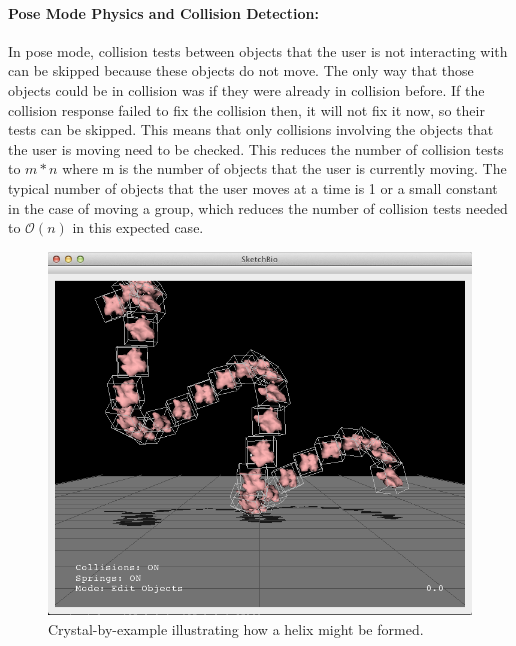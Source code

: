 \documentclass[twocolumn]{bmcart}%
\begin{document}
\paragraph*{Pose Mode Physics and Collision Detection:}
In pose mode, collision tests between objects that the user is not interacting with can be skipped because these objects do not move.
The only way that those objects could be in collision was if they were already in collision before.
If the collision response failed to fix the collision then, it will not fix it now, so their tests can be skipped.
This means that only collisions involving the objects that the user is moving need to be checked.
This reduces the number of collision tests to $m*n$ where m is the number of objects that the user is currently moving.
The typical number of objects that the user moves at a time is 1 or a small constant in the case of moving a group, which reduces the number of collision tests needed to $\mathcal{O}(n)$ in this expected case.

\begin{figure}[h]
\centering
\includegraphics[width=0.9\columnwidth]{crystalByExample.png}
\caption{Crystal-by-example illustrating how a helix might be formed.}
\label{fig:crystal_by_example}
\end{figure}
\end{document}
